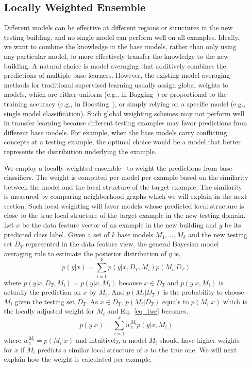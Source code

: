 \subsection{Locally Weighted Ensemble}
Different models can be effective at different regions or structures in the new testing building, and no single model can perform well on all examples. 
Ideally, we want to combine the knowledge in the base models, rather than only using any particular model, to more effectively transfer the knowledge to the new building. A natural choice is model averaging that additively combines the predictions of multiple base learners. 
However, the existing model averaging methods for traditional supervised learning usually assign global weights to models, which are either uniform (e.g., in Bagging~\cite{bagging}) or proportional to the training accuracy (e.g., in Boosting~\cite{boosting}), or simply relying on a specific model (e.g., single model classification).
Such global weighting schemes may not perform well in transfer learning because different testing examples may favor predictions from different base models. 
For example, when the base models carry conflicting concepts at a testing example, the optimal choice would be a model that better represents the distribution underlying the example.

We employ a locally weighted ensemble~\cite{lwe} to weight the predictions from base classifiers. 
The weight is computed per model per example based on the similarity between the model and the local structure of the target example. The similarity is measured by comparing neighborhood graphs which we will explain in the next section. Such local weighting will favor models whose predicted local structure is close to the true local structure of the target example in the new testing domain. Let $x$ be the data feature vector of an example in the new building and $y$ be its predicted class label. Given a set of $k$ base models $M_1, \dots, M_k$ and the new testing set $D_T$ represented in the data feature view, the general Bayesian model averaging rule to estimate the posterior distribution of $y$ is,
\begin{equation}\label{eq_lwe}
p(y|x)=\sum_{i=1}^k p(y|x,D_T,M_i) p(M_i|D_T)
\end{equation}
where $p(y|x,D_T,M_i) = p(y|x,M_i)$ because $x \in D_T$ and $p(y|x,M_i)$ is actually the prediction on $x$ by $M_i$. And $p(M_i|D_T)$ is the probability to choose $M_i$ given the testing set $D_T$. As $x \in D_T$, $p(M_i|D_T)$ equals to $p(M_i|x)$ which is the locally adjusted weight for $M_i$ and Eq.~\ref{eq_lwe} becomes,
\begin{equation}\label{eq_sum}
p(y|x)=\sum_{i=1}^k w_{x}^{M_i} p(y|x, M_i)
\end{equation}
where $w_{x}^{M_i} = p(M_i|x)$ and intuitively, a model $M_i$ should have higher weights for $x$ if $M_i$ predicts a similar local structure of $x$ to the true one.
We will next explain how the weight is calculated per example.


